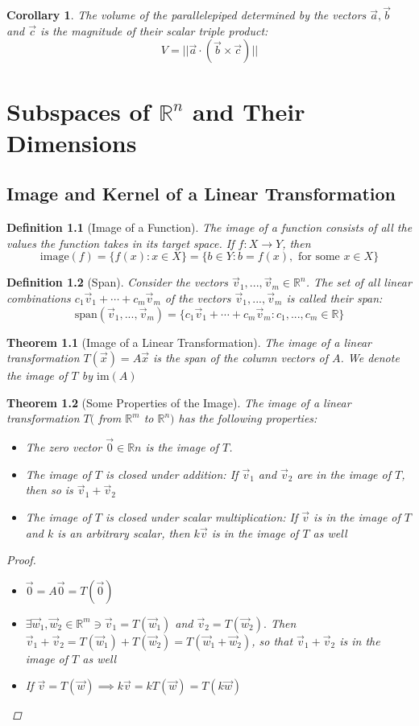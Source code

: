 \documentclass[10pt]{report}
\newtheorem{thm2}{Theorem}[section]
\newtheorem{cor2}{Corollary}[section]
\newtheorem{def2}{Definition}[section]
\begin{document}
\begin{cor2}
The volume of the parallelepiped determined by the vectors $\vec{a}, \vec{b}$ and $\vec{c}$ is the magnitude of their scalar triple product:
$$V = ||\vec{a}\cdot (\vec{b}\times \vec{c})||$$
\end{cor2}

\chapter{Subspaces of $\mathbb{R}^{n}$ and Their Dimensions}
\section{Image and Kernel of a Linear Transformation}
\begin{def2}[Image of a Function]
The image of a function consists of all the values the function takes in its target space. If $f:X\to Y$, then
$$\text{image}(f) = \{f(x): x\in X\}=\{b\in Y: b=f(x), \text{ for some } x\in X\}$$
\end{def2}
\begin{def2}[Span]
Consider the vectors $\vec{v}_1,...,\vec{v}_m \in \mathbb{R}^n$. The set of all linear combinations $c_1\vec{v}_1 + \cdots + c_m\vec{v}_m$ of the vectors $\vec{v}_1,...,\vec{v}_m$ is called their span:
$$\text{span}(\vec{v}_1,...,\vec{v}_m) = \{c_1\vec{v}_1 + \cdots + c_m\vec{v}_m: c_1,...,c_m\in \mathbb{R}\}$$
\end{def2}
\begin{thm2}[Image of a Linear Transformation]
The image of a linear transformation $T(\vec{x})=A\vec{x}$ is the span of the column vectors of $A$. We denote the image of $T$ by $\text{im}(A)$
\end{thm2}
\begin{thm2}[Some Properties of the Image]
The image of a linear transformation $T($ from $\mathbb{R}^m$ to $\mathbb{R}^n)$ has the following properties:
\begin{itemize}
\item[a.] The zero vector $\vec{0}\in \mathbb{R}n$ is the image of $T$.
\item[b.] The image of $T$ is closed under addition: If $\vec{v}_1$ and $\vec{v}_2$ are in the image of $T$, then so is $\vec{v}_1+\vec{v}_2$
\item[c.] The image of $T$ is closed under scalar multiplication: If $\vec{v}$ is in the image of $T$ and $k$ is an arbitrary scalar, then $k\vec{v}$ is in the image of $T$ as well
\end{itemize}
\begin{proof}
\begin{itemize}
\item[a.] $\vec{0}=A\vec{0} = T(\vec{0})$
\item[b.] $\exists\vec{w}_1, \vec{w}_2\in \mathbb{R}^m\ni \vec{v}_1=T(\vec{w}_1)$ and $\vec{v}_2=T(\vec{w}_2).$ Then $\vec{v}_1+\vec{v}_2=T(\vec{w}_1) + T(\vec{w}_2)=T(\vec{w}_1+\vec{w}_2)$, so that $\vec{v}_1+\vec{v}_2$ is in the image of $T$ as well
\item[c.] If $\vec{v}=T(\vec{w}) \implies k\vec{v}=kT(\vec{w}) =T(k\vec{w})$
\end{itemize}
\end{proof}
\end{thm2}
\end{document}
